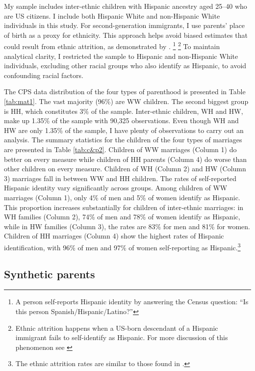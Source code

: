 My sample includes inter-ethnic children with Hispanic ancestry aged 25–40 who are US citizens. I include both Hispanic White and non-Hispanic White individuals in this study. For second-generation immigrants, I use parents' place of birth as a proxy for ethnicity. This approach helps avoid biased estimates that could result from ethnic attrition, as demonstrated by \textcite{hadah2024effect}. \footnote{A person self-reports Hispanic identity by answering the Census question: ``Is this person Spanish/Hispanic/Latino?''} \footnote{Ethnic attrition happens when a US-born descendant of a Hispanic immigrant fails to self-identify as Hispanic. For more discussion of this phenomenon see \textcite{antmanEthnicAttritionObserved2016,antmanEthnicAttritionAssimilation2020}} To maintain analytical clarity, I restricted the sample to Hispanic and non-Hispanic White individuals, excluding other racial groups who also identify as Hispanic, to avoid confounding racial factors.

The CPS data distribution of the four types of parenthood is presented in Table \ref{tab:mat1}. The vast majority (96\%) are WW children. The second biggest group is HH, which constitutes 3\% of the sample. Inter-ethnic children, WH and HW, make up 1.35\% of the sample with 90,325 observations. Even though WH and HW are only 1.35\% of the sample, I have plenty of observations to carry out an analysis. The summary statistics for the children of the four types of marriages are presented in Table \ref{tab:c&p2}. Children of WW marriages (Column 1) do better on every measure while children of HH parents (Column 4) do worse than other children on every measure. Children of WH (Column 2) and HW (Column 3) marriages fall in between WW and HH children. The rates of self-reported Hispanic identity vary significantly across groups. Among children of WW marriages (Column 1), only 4\% of men and 5\% of women identify as Hispanic. This proportion increases substantially for children of inter-ethnic marriages: in WH families (Column 2), 74\% of men and 78\% of women identify as Hispanic, while in HW families (Column 3), the rates are 83\% for men and 81\% for women. Children of HH marriages (Column 4) show the highest rates of Hispanic identification, with 96\% of men and 97\% of women self-reporting as Hispanic.\footnote{The ethnic attrition rates are similar to those found in \textcite{antmanEthnicAttritionObserved2016,antmanEthnicAttritionAssimilation2020, hadah2024effect}.}
 
\subsection{Synthetic parents}

